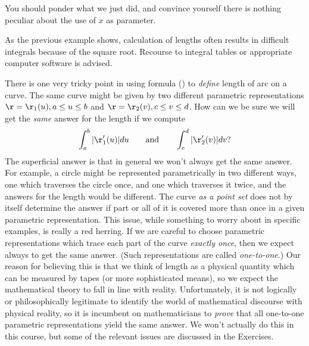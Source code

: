 You should ponder what we just did, and convince yourself there is
nothing peculiar about the use of $x$ as parameter.
\endexample

As the previous example shows, calculation of lengths often results
in difficult integrals because of the square root.  Recourse to
integral tables or appropriate computer software is advised.

There is one very tricky point in using formula (\eqnone) to
{\it define\/} length of arc on a curve.  The same curve might
be given by two different parametric representations
$\r = \r_1(u), a\le u \le b$ and $\r = \r_2(v), c \le v \le d$.
How can we be sure we will get the {\it same\/} answer for
the length if we compute
$$
   \int_a^b |\r'_1(u)| du\qquad\text{and}\qquad
\int_c^d |\r_2'(v)| dv ?
$$
The superficial answer is that in general we won't always
get the same answer.  For example,
a circle might be represented parametrically in two different
ways, one which traverses the circle  once, and one
which traverses it twice, and the answers for the length
would be different.  The curve {\it as a point set\/}
does not by itself determine the answer if part or all of it
is covered more than once in a given parametric representation.
This issue, while something to
worry about in specific examples, is really a red herring.  If we
are careful to choose parametric representations which trace each
part of the curve {\it exactly once}, then we expect always
to get the same answer.  (Such representations are called
{\it one-to-one}.)  Our reason for believing this is that
we think of length as a physical quantity which can be measured
by tapes (or more sophisticated means), so we expect the mathematical
theory to fall in line with reality.  Unfortunately, it is not logically
or philosophically legitimate to 
identify the world of  mathematical discourse with
physical reality, so it is incumbent on mathematicians to {\it prove\/}
that all one-to-one parametric representations yield the same answer.
We won't actually do this in this course, but some of the relevant
issues are discussed in the Exercises.


